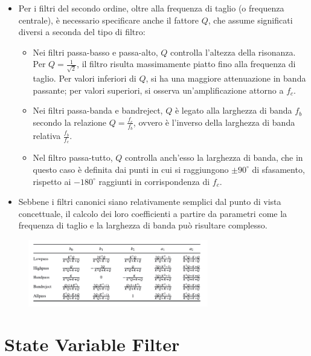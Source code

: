 \begin{itemize}
    \item Per i filtri del secondo ordine, oltre alla frequenza di taglio (o frequenza centrale), è necessario specificare anche il fattore $Q$, che assume significati diversi a seconda del tipo di filtro:
    
    \begin{itemize}
        \item Nei filtri passa-basso e passa-alto, $Q$ controlla l'altezza della risonanza. Per $Q = \frac{1}{\sqrt{2}}$, il filtro risulta massimamente piatto fino alla frequenza di taglio. Per valori inferiori di $Q$, si ha una maggiore attenuazione in banda passante; per valori superiori, si osserva un'amplificazione attorno a $f_c$.
        
        \item Nei filtri passa-banda e bandreject, $Q$ è legato alla larghezza di banda $f_b$ secondo la relazione $Q = \frac{f_c}{f_b}$, ovvero è l'inverso della larghezza di banda relativa $\frac{f_b}{f_c}$.
        
        \item Nel filtro passa-tutto, $Q$ controlla anch'esso la larghezza di banda, che in questo caso è definita dai punti in cui si raggiungono $\pm 90^\circ$ di sfasamento, rispetto ai $-180^\circ$ raggiunti in corrispondenza di $f_c$.
    \end{itemize}
    
    \item Sebbene i filtri canonici siano relativamente semplici dal punto di vista concettuale, il calcolo dei loro coefficienti a partire da parametri come la frequenza di taglio e la larghezza di banda può risultare complesso.
\end{itemize}

\begin{figure}[H]
    \centering
    \includegraphics[width=0.7\textwidth]{capitoli/capitolo15/immagini/image3.png}
\end{figure}

\section{State Variable Filter}

